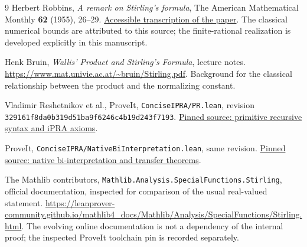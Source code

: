 \documentclass[11pt]{article}
\theoremstyle{definition}
\newcommand{\repo}{\texttt{329161f8da0b319d51ba9f6246c4b19d243f7193}}
\begin{document}
\begin{thebibliography}{9}
Herbert Robbins, \emph{A remark on Stirling's formula},
The American Mathematical Monthly \textbf{62} (1955), 26--29.
\href{https://heuklyd.github.io/papers/pdf/Robbins-1955.pdf}{Accessible transcription of the paper}.
The classical numerical bounds are attributed to this source; the
finite-rational realization is developed explicitly in this manuscript.

Henk Bruin, \emph{Wallis' Product and Stirling's Formula}, lecture notes.
\url{https://www.mat.univie.ac.at/~bruin/Stirling.pdf}.
Background for the classical relationship between the product and the
normalizing constant.

Vladimir Reshetnikov et al., ProveIt, \texttt{ConciseIPRA/PR.lean},
revision \repo.
\href{https://github.com/VladimirReshetnikov/ProveIt/blob/329161f8da0b319d51ba9f6246c4b19d243f7193/Logic/PrimitiveRecursiveArithmetic/ConciseIPRA/Lean/ConciseIPRA/PR.lean}{Pinned source: primitive recursive syntax and iPRA axioms}.

ProveIt, \texttt{ConciseIPRA/NativeBiInterpretation.lean}, same revision.
\href{https://github.com/VladimirReshetnikov/ProveIt/blob/329161f8da0b319d51ba9f6246c4b19d243f7193/Logic/PrimitiveRecursiveArithmetic/ConciseIPRA/Lean/ConciseIPRA/NativeBiInterpretation.lean}{Pinned source: native bi-interpretation and transfer theorems}.

The Mathlib contributors, \texttt{Mathlib.Analysis.SpecialFunctions.Stirling},
official documentation, inspected for comparison of the usual real-valued
statement.
\url{https://leanprover-community.github.io/mathlib4_docs/Mathlib/Analysis/SpecialFunctions/Stirling.html}.
The evolving online documentation is not a dependency of the internal
proof; the inspected ProveIt toolchain pin is recorded separately.
\end{thebibliography}
\end{document}
